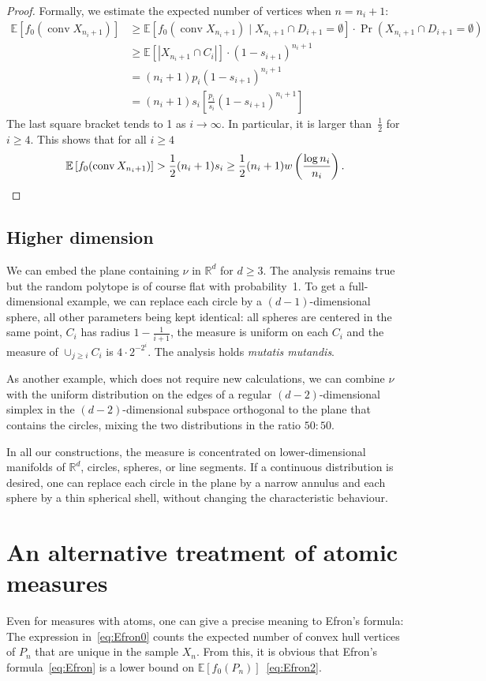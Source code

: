 \documentclass[AHL,Unicode,longabstracts]{cedram}
\DeclareMathOperator{\conv}{conv}
\newcommand{\Rbb}{\mathbb{R}}%
\newcommand{\Ebb}{\mathbb{E}}%
\newcommand{\ptb}[1]{\left[#1 \right]}
\newcommand*{\mtfrac}[2]{\frac{#1}{#2}}%
\begin{document}
\goodbreak
\begin{proof}
Formally, we estimate the expected number of vertices when $n=n_i+1$:
\begin{align*}
\Ebb\ptb{f_0(\conv X_{n_i+1})}
&\ge\Ebb\ptb{f_0(\conv X_{n_i+1})\mid X_{n_i+1}\cap D_{i+1}=\emptyset} \cdot
\Pr(X_{n_i+1}\cap D_{i+1}=\emptyset)\\
&\ge\Ebb[|X_{n_i+1}\cap C_i|]\cdot(1-s_{i+1})^{n_i+1}\\
&=(n_i+1)p_i(1-s_{i+1})^{n_i+1}\\
&=(n_i+1)s_i\left[\frac {p_i}{s_i}(1-s_{i+1})^{n_i+1}\right]
\end{align*}
The last square bracket tends to 1 as $i \to \infty$. In particular, it is larger than~$\frac 12$ for $i \ge 4$. This shows that for all $i\ge 4$
\[
\Ebb\ptb{f_0(\conv X_{n_i+1})}>\frac 12 (n_i+1)s_i
\ge
\frac 12(n_i+1)w\left(\mtfrac{\log n_i} {n_i}\right).
\qedhere
\]
\end{proof}


\subsection{Higher dimension}

We can embed the plane containing $\nu$ in $\Rbb^d$ for $d \ge 3$. The analysis remains true but the random polytope is of course flat with probability~1. To get a full-dimensional example, we can replace each circle by a $(d-1)$-dimensional sphere, all other parameters being kept identical: all spheres are centered in the same point, $C_i$ has radius $1-\frac{1}{i+1}$, the measure is uniform on each $C_i$ and the measure of $\cup_{j \ge i} C_i$ is $4 \cdot 2^{-2^i}$. The analysis holds
\emph{mutatis mutandis}.

As another example, which does not require new calculations, we can combine $\nu$ with the uniform distribution on the edges of a regular $(d-2)$-dimensional simplex in the $(d-2)$-dimensional subspace orthogonal to the plane that contains the circles, mixing the two distributions in the ratio $50:50$.

In all our constructions, the measure is concentrated on lower-dimensional manifolds of $\Rbb^d$, circles, spheres, or line segments. If a continuous distribution is desired, one can replace each circle in the plane by a narrow annulus and each sphere by a thin spherical shell, without changing the characteristic behaviour.


\section{An alternative treatment of atomic measures}\label{sec:alternative}
Even for measures with atoms, one can give a precise meaning to Efron's formula: The expression in~\eqref{eq:Efron0} counts the expected number of convex hull vertices of $P_n$ that are unique in the sample $X_n$. From this, it is obvious that Efron's formula~\eqref{eq:Efron} is a lower bound on $\Ebb[f_0(P_n)]$~\eqref{eq:Efron2}.
\end{document}
